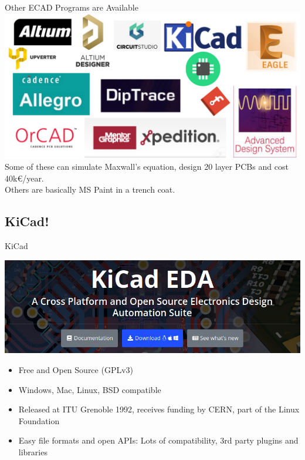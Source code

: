 \documentclass{beamer}
\begin{document}
\begin{frame}{Other ECAD Programs are Available}
  \includegraphics[width=\textwidth]{images/ecad-logos.png}
  \pause
  Some of these can simulate Maxwall's equation, design 20 layer PCBs and cost 40k€/year.\\
  \pause
  Others are basically MS Paint in a trench coat.
\end{frame}

\subsection{KiCad!}

\begin{frame}{KiCad}
  \begin{center}
    \includegraphics[width=\textwidth]{images/kicad-banner.png}
  \end{center}
  \vspace{-0.2cm}
  \begin{itemize}
    \item Free and Open Source (GPLv3)
    \item Windows, Mac, Linux, BSD compatible
    \item Released at ITU Grenoble 1992, receives funding by CERN, part of the Linux Foundation
    \item Easy file formats and open APIs: Lots of compatibility, 3rd party plugins and libraries
  \end{itemize}
\end{frame}
\end{document}
